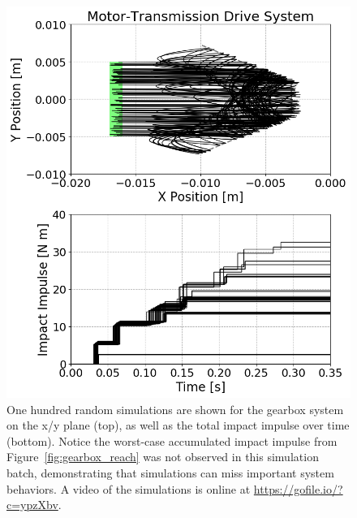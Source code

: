 \begin{figure}[t]
\centerline{\includegraphics[width=0.8\columnwidth]{images/gearbox_sim.png}}
\caption{One hundred random simulations are shown for the gearbox system on the x/y plane (top), as well as the total impact impulse over time (bottom).
%
Notice the worst-case accumulated impact impulse from Figure~\ref{fig:gearbox_reach} was not observed in this simulation batch,
demonstrating that simulations can miss important system behaviors.
%
A video of the simulations is online at \url{https://gofile.io/?c=ypzXbv}.}
\label{fig:gearbox_sim}
\end{figure}
